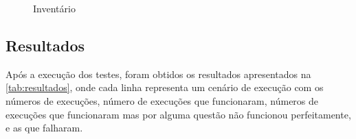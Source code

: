 \begin{figure}[ht]
        \centering\caption{Inventário}
        \label{fig:invent}
         \hspace{0.5cm}
             \hspace{0.5cm}
        \hspace{0.5cm}
             \hspace{0.5cm}
              \hspace{0.5cm}
        
\end{figure}
\subsection{Resultados}

Após a execução dos testes, foram obtidos os resultados apresentados na \autoref{tab:resultados}, onde cada linha representa um cenário de execução com os números de execuções, número de execuções que funcionaram, números de execuções que funcionaram mas por alguma questão não funcionou perfeitamente, e as que falharam.

